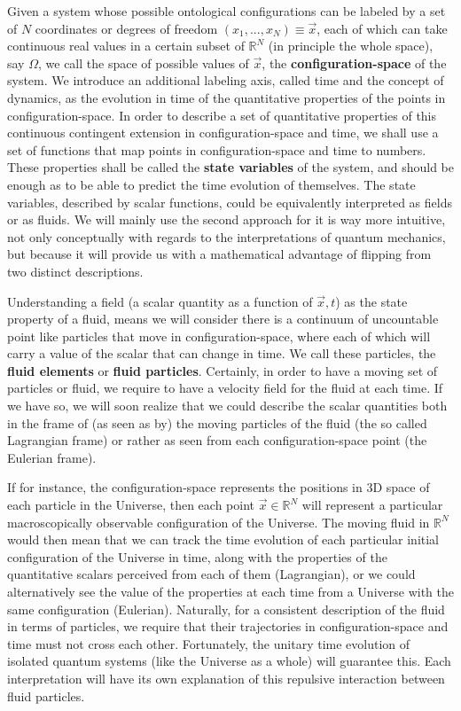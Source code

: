 \documentclass[11pt, a4paper]{article} %
\newcommand{\R}{\mathbb{R}} %
\begin{document}
Given a system whose possible ontological configurations can be labeled by a set of $N$ coordinates or degrees of freedom $(x_1, ...,x_N)\equiv \vec{x}$, each of which can take continuous real values in a certain subset of $\R^N$ (in principle the whole space), say $\Omega$, we call the space of possible values of $\vec{x}$, the {\bf configuration-space} of the system. We introduce an additional labeling axis, called time and the concept of dynamics, as the evolution in time of the quantitative properties of the points in configuration-space. In order to describe a set of quantitative properties of this continuous contingent extension in configuration-space and time, we shall use a set of functions that map points in configuration-space and time to numbers. These properties shall be called the {\bf state variables} of the system, and should be enough as to be able to predict the time evolution of themselves. The state variables, described by scalar functions, could be equivalently interpreted as fields or as fluids. We will mainly use the second approach for it is way more intuitive, not only conceptually with regards to the interpretations of quantum mechanics, but because it will provide us with a mathematical advantage of flipping from two distinct descriptions. 

Understanding a field (a scalar quantity as a function of $\vec{x},t$) as the state property of a fluid, means we will consider there is a continuum of uncountable point like particles that move in configuration-space, where each of which will carry a value of the scalar that can change in time. We call these particles, the {\bf fluid elements} or {\bf fluid particles}. Certainly, in order to have a moving set of particles or fluid, we require to have a velocity field for the fluid at each time. If we have so, we will soon realize that we could describe the scalar quantities both in the frame of (as seen as by) the moving particles of the fluid (the so called Lagrangian frame) or rather as seen from each configuration-space point (the Eulerian frame).

If for instance, the configuration-space represents the positions in 3D space of each particle in the Universe, then each point $\vec{x}\in \R^N$ will represent a particular macroscopically observable configuration of the Universe. The moving fluid in $\R^N$ would then mean that we can track the time evolution of each particular initial configuration of the Universe in time, along with the properties of the quantitative scalars perceived from each of them (Lagrangian), or we could alternatively see the value of the properties at each time from a Universe with the same configuration (Eulerian). Naturally, for a consistent description of the fluid in terms of particles, we require that their trajectories in configuration-space and time  must not cross each other. Fortunately, the unitary time evolution of isolated quantum systems (like the Universe as a whole) will guarantee this. Each interpretation will have its own explanation of this repulsive interaction between fluid particles.
\end{document}
